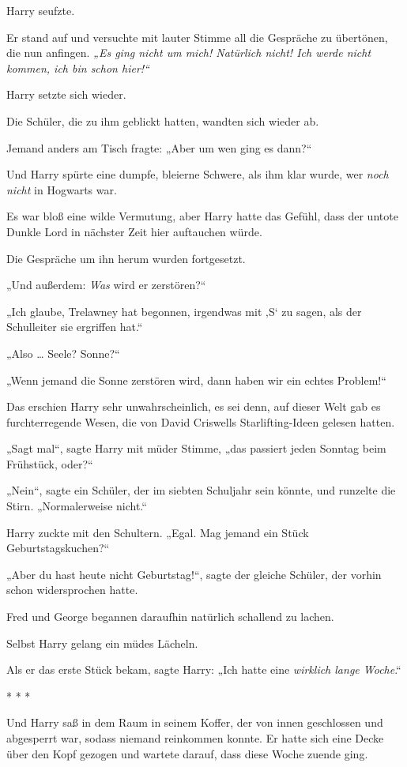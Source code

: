 {Harry seufzte.

Er stand auf und versuchte mit lauter Stimme all die Gespräche zu übertönen, die nun anfingen. \emph{„Es ging nicht um mich! Natürlich nicht! Ich werde nicht kommen, ich bin schon hier!“}

Harry setzte sich wieder.

Die Schüler, die zu ihm geblickt hatten, wandten sich wieder ab.

Jemand anders am Tisch fragte: „Aber um wen ging es dann?“

Und Harry spürte eine dumpfe, bleierne Schwere, als ihm klar wurde, wer \emph{noch nicht} in Hogwarts war.

Es war bloß eine wilde Vermutung, aber Harry hatte das Gefühl, dass der untote Dunkle Lord in nächster Zeit hier auftauchen würde.

Die Gespräche um ihn herum wurden fortgesetzt.

„Und außerdem: \emph{Was} wird er zerstören?“

„Ich glaube, Trelawney hat begonnen, irgendwas mit ‚S` zu sagen, als der Schulleiter sie ergriffen hat.“

„Also … Seele? Sonne?“

„Wenn jemand die Sonne zerstören wird, dann haben wir ein echtes Problem!“

Das erschien Harry sehr unwahrscheinlich, es sei denn, auf dieser Welt gab es furchterregende Wesen, die von David Criswells Starlifting-Ideen gelesen hatten.

„Sagt mal“, sagte Harry mit müder Stimme, „das passiert jeden Sonntag beim Frühstück, oder?“

„Nein“, sagte ein Schüler, der im siebten Schuljahr sein könnte, und runzelte die Stirn. „Normalerweise nicht.“

Harry zuckte mit den Schultern. „Egal. Mag jemand ein Stück Geburtstagskuchen?“

„Aber du hast heute nicht Geburtstag!“, sagte der gleiche Schüler, der vorhin schon widersprochen hatte.

Fred und George begannen daraufhin natürlich schallend zu lachen.

Selbst Harry gelang ein müdes Lächeln.

Als er das erste Stück bekam, sagte Harry: „Ich hatte eine \emph{wirklich lange Woche}.“

* * *

Und Harry saß in dem Raum in seinem Koffer, der von innen geschlossen und abgesperrt war, sodass niemand reinkommen konnte. Er hatte sich eine Decke über den Kopf gezogen und wartete darauf, dass diese Woche zuende ging.

}

